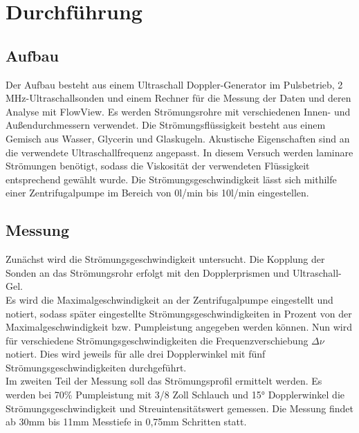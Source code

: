 \section{Durchführung}
\label{sec:Durchführung}

\subsection{Aufbau}

Der Aufbau besteht aus einem Ultraschall Doppler-Generator im Pulsbetrieb,
2 MHz-Ultraschallsonden und einem Rechner für die Messung der Daten und deren Analyse mit FlowView. 
Es werden Strömungsrohre mit verschiedenen Innen- und Außendurchmessern verwendet.  
Die Strömungsflüssigkeit besteht aus einem Gemisch aus Wasser, Glycerin und Glaskugeln. 
Akustische Eigenschaften sind an die verwendete Ultraschallfrequenz angepasst. In diesem
Versuch werden laminare Strömungen benötigt, sodass die Viskosität der verwendeten Flüssigkeit
entsprechend gewählt wurde. Die Strömungsgeschwindigkeit lässt sich mithilfe einer Zentrifugalpumpe 
im Bereich von 0\;l/min bis 10\;l/min eingestellen.

\subsection{Messung}

Zunächst wird die Strömungsgeschwindigkeit untersucht. Die Kopplung der Sonden an das Strömungsrohr 
erfolgt mit den Dopplerprismen und Ultraschall-Gel.\\
\noindent Es wird die Maximalgeschwindigkeit an der Zentrifugalpumpe eingestellt und notiert, sodass später eingestellte 
Strömungsgeschwindigkeiten in Prozent von der Maximalgeschwindigkeit bzw. Pumpleistung angegeben werden können. Nun 
wird für verschiedene Strömungsgeschwindigkeiten die Frequenzverschiebung $\Delta\nu$ notiert.
Dies wird jeweils für alle drei Dopplerwinkel mit fünf Strömungsgeschwindigkeiten durchgeführt.\\
\newline 
\noindent Im zweiten Teil der Messung soll das Strömungsprofil ermittelt werden. Es werden bei 70\;\% Pumpleistung mit 
3/8 Zoll Schlauch und 15° Dopplerwinkel die Strömungsgeschwindigkeit und Streuintensitätswert gemessen. Die Messung findet
ab 30\;mm bis 11\;mm Messtiefe in 0,75\;mm Schritten statt.
